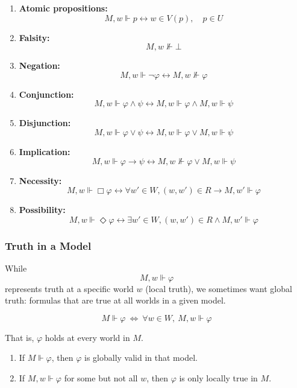 \documentclass[12pt,a4paper,openany]{article}
\begin{document}
\begin{enumerate}
    \item \textbf{Atomic propositions:}
    $$M, w \Vdash p \leftrightarrow w \in V(p), \quad p \in U$$
    
    \item \textbf{Falsity:}
    $$M, w \nVdash \bot$$
    
    \item \textbf{Negation:}
    $$M, w \Vdash \neg \varphi \leftrightarrow M, w \nVdash \varphi$$
    
    \item \textbf{Conjunction:}
    $$M, w \Vdash \varphi \wedge \psi \leftrightarrow M, w \Vdash \varphi \wedge M, w \Vdash \psi$$
    
    \item \textbf{Disjunction:}
    $$M, w \Vdash \varphi \vee \psi \leftrightarrow M, w \Vdash \varphi \vee M, w \Vdash \psi$$
    
    \item \textbf{Implication:}
    $$M, w \Vdash \varphi \to \psi \leftrightarrow M, w \nVdash \varphi \vee M, w \Vdash \psi$$
    
    \item \textbf{Necessity:}
    $$M, w \Vdash \Box \varphi \leftrightarrow \forall w' \in W, (w,w') \in R \to M, w' \Vdash \varphi$$
    
    \item \textbf{Possibility:}
    $$M, w \Vdash \Diamond \varphi \leftrightarrow \exists w' \in W, (w,w') \in R \wedge M, w' \Vdash \varphi$$
\end{enumerate}

\subsubsection{Truth in a Model}

While
$$M, w \Vdash \varphi$$
represents truth at a specific world $w$ (local truth), we sometimes want global truth: formulas that are true at all worlds in a given model.

$$M \Vdash \varphi \ \Leftrightarrow\ \forall w \in W, \ M, w \Vdash \varphi$$

That is, $\varphi$ holds at every world in $M$.

\begin{enumerate}
    \item If $M \Vdash \varphi$, then $\varphi$ is globally valid in that model.
    \item If $M, w \Vdash \varphi$ for some but not all $w$, then $\varphi$ is only locally true in $M$.
\end{enumerate}
\end{document}
